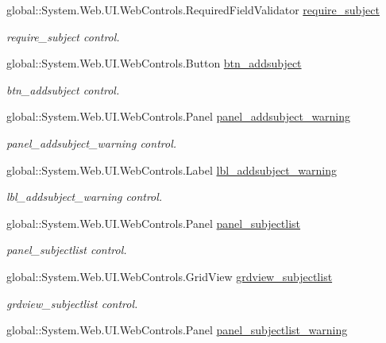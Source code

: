 \begin{DoxyCompactItemize}
global\+::\+System.\+Web.\+U\+I.\+Web\+Controls.\+Required\+Field\+Validator \mbox{\hyperlink{class_admin__subject_a6fe3d462469595075e89ee44c72c1f05}{require\+\_\+subject}}
\begin{DoxyCompactList}\small\item\em require\+\_\+subject control. \end{DoxyCompactList}\item 
global\+::\+System.\+Web.\+U\+I.\+Web\+Controls.\+Button \mbox{\hyperlink{class_admin__subject_a1816029ef09c07c5754fbf0fb556fd8f}{btn\+\_\+addsubject}}
\begin{DoxyCompactList}\small\item\em btn\+\_\+addsubject control. \end{DoxyCompactList}\item 
global\+::\+System.\+Web.\+U\+I.\+Web\+Controls.\+Panel \mbox{\hyperlink{class_admin__subject_ac17e12ca2da95ef3eb470ff1c3522494}{panel\+\_\+addsubject\+\_\+warning}}
\begin{DoxyCompactList}\small\item\em panel\+\_\+addsubject\+\_\+warning control. \end{DoxyCompactList}\item 
global\+::\+System.\+Web.\+U\+I.\+Web\+Controls.\+Label \mbox{\hyperlink{class_admin__subject_ab3901761a390377f74a2c75a3e622766}{lbl\+\_\+addsubject\+\_\+warning}}
\begin{DoxyCompactList}\small\item\em lbl\+\_\+addsubject\+\_\+warning control. \end{DoxyCompactList}\item 
global\+::\+System.\+Web.\+U\+I.\+Web\+Controls.\+Panel \mbox{\hyperlink{class_admin__subject_a413f1ba966649d23b930fa430bf0feed}{panel\+\_\+subjectlist}}
\begin{DoxyCompactList}\small\item\em panel\+\_\+subjectlist control. \end{DoxyCompactList}\item 
global\+::\+System.\+Web.\+U\+I.\+Web\+Controls.\+Grid\+View \mbox{\hyperlink{class_admin__subject_a63e660f898fdb9a1f2164477d94207a1}{grdview\+\_\+subjectlist}}
\begin{DoxyCompactList}\small\item\em grdview\+\_\+subjectlist control. \end{DoxyCompactList}\item 
global\+::\+System.\+Web.\+U\+I.\+Web\+Controls.\+Panel \mbox{\hyperlink{class_admin__subject_ab0039b3853960b22adc6541c55605754}{panel\+\_\+subjectlist\+\_\+warning}}

\end{DoxyCompactItemize}

